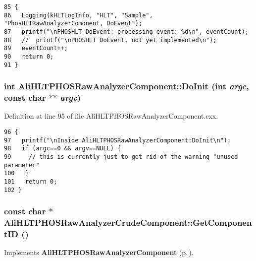 \footnotesize\begin{verbatim}85 {
86   Logging(kHLTLogInfo, "HLT", "Sample", "PhosHLTRawAnalyzerComonent, DoEvent");
87   printf("\nPHOSHLT DoEvent: processing event: %d\n", eventCount);
88   //  printf("\nPHOSHLT DoEvent, not yet implemented\n");
89   eventCount++;
90   return 0;
91 }
\end{verbatim}\normalsize 


\subsubsection{\setlength{\rightskip}{0pt plus 5cm}int Ali\-HLTPHOSRaw\-Analyzer\-Component::Do\-Init (int {\em argc}, const char $\ast$$\ast$ {\em argv})\hspace{0.3cm}{\tt  [virtual, inherited]}}\label{classAliHLTPHOSRawAnalyzerComponent_AliHLTPHOSRawAnalyzerPeakFinderComponenta6}




Definition at line 95 of file Ali\-HLTPHOSRaw\-Analyzer\-Component.cxx.

\footnotesize\begin{verbatim}96 {
97   printf("\nInside AliHLTPHOSRawAnalyzerComponent:DoInit\n");
98   if (argc==0 && argv==NULL) {
99     // this is currently just to get rid of the warning "unused parameter"
100   }
101   return 0;
102 }
\end{verbatim}\normalsize 


\subsubsection{\setlength{\rightskip}{0pt plus 5cm}const char $\ast$ Ali\-HLTPHOSRaw\-Analyzer\-Crude\-Component::Get\-Component\-ID ()\hspace{0.3cm}{\tt  [virtual]}}\label{classAliHLTPHOSRawAnalyzerCrudeComponent_AliHLTPHOSRawAnalyzerCrudeComponenta4}




Implements {\bf Ali\-HLTPHOSRaw\-Analyzer\-Component} {\rm (p.\,\pageref{classAliHLTPHOSRawAnalyzerComponent_AliHLTPHOSRawAnalyzerComponenta7})}.

